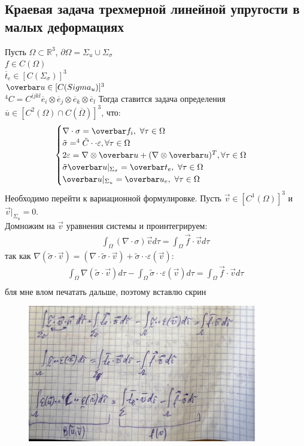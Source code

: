 \documentclass[__main__.tex]{subfiles}
\begin{document}
\subsection{Краевая задача трехмерной линейной упругости в малых деформациях}

Пусть $\Omega \subset \mathbb R^3$, $\partial \Omega = \Sigma_u \cup \Sigma_\sigma$\\
$f \in C(\Omega)$\\
$\overbar t_e \in [C(\Sigma_\sigma)]^3$\\
$\overbar u \in [C(\\Sigma_u)]^3$\\
$^4C=C^{ijkl}\overbar e_i \otimes \overbar e_j \otimes \overbar e_k \otimes \overbar e_l$
Тогда ставится задача определения $\overbar u \in [C^2(\Omega) \cap C(\overbar \Omega)]^3$, что:
\begin{gather*}
    \begin{cases}
        \nabla \cdot \sigma = \overbar f_i, \ \forall \tau \in \Omega \hfill \\
        \tilde{\sigma} =^4\tilde C \cdot \cdot \varepsilon, \forall \tau \in \Omega \hfill \\
        2 \varepsilon = \nabla \otimes \overbar u + (\nabla \otimes \overbar u)^T, \forall \tau \in \Omega \hfill \\
        \tilde{\sigma} \overbar u |_{\Sigma_\sigma} = \overbar t_e, \ \forall \tau \in \Omega \hfill \\
        \overbar u |_{\Sigma_{u}} = \overbar u_e, \ \forall \tau \in \Omega \hfill \\
    \end{cases}
\end{gather*}
Необходимо перейти к вариационной формулировке. Пусть $\vec{v} \in [C^1(\Omega)]^3$ и $\vec v |_{\Sigma_u}=0$. \\
Домножим на $\vec v$ уравнения системы и проинтегрируем:
\begin{gather*}
    \int_{\Omega} (\nabla \cdot \sigma)\vec v d \tau = \int_{\Omega} \vec f \cdot \vec v d \tau  
\end{gather*}
так как $\nabla(\tilde{\sigma}\cdot \vec v) =(\nabla \cdot \tilde{\sigma}\cdot \vec v) + \tilde{\sigma}\cdot \cdot \varepsilon(\vec v)$:
\begin{gather*}
    \int_{\Omega} \nabla (\tilde{\sigma}\cdot \vec v) d \tau - \int_{\Omega} \tilde{\sigma}\cdot \cdot \varepsilon(\vec{v})d\tau = \int_{\Omega} \vec f \cdot \vec v d\tau \\
\end{gather*}
бля мне влом печатать дальше, поэтому вставлю скрин
\begin{figure}[H]
    \begin{centering}
        \includegraphics[width=10cm]{16}
    \end{centering}
\end{figure}
\end{document}
